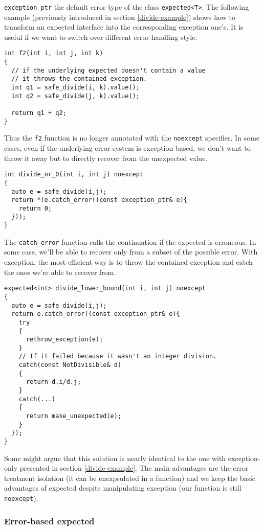 \documentclass[a4paper,10pt]{article}
\newcommand{\cpp}[1]{\lstinline{#1}}
\begin{document}
\cpp{exception_ptr} the default error type of the class \cpp{expected<T>}. The following example (previously introduced in section \ref{divide-example}) shows how to transform an expected interface into the corresponding exception one's. It is useful if we want to switch over different error-handling style.

\begin{lstlisting}
int f2(int i, int j, int k)
{
  // if the underlying expected doesn't contain a value
  // it throws the contained exception.
  int q1 = safe_divide(i, k).value();
  int q2 = safe_divide(j, k).value();

  return q1 + q2;
}
\end{lstlisting}

Thus the \cpp{f2} function is no longer annotated with the \cpp{noexcept} specifier. In some cases, even if the underlying error system is exception-based, we don't want to throw it away but to directly recover from the unexpected value. 

\begin{lstlisting}
int divide_or_0(int i, int j) noexcept
{
  auto e = safe_divide(i,j);
  return *(e.catch_error((const exception_ptr& e){
    return 0;
  }));
}
\end{lstlisting}

The \cpp{catch_error} function calls the continuation if the expected is erroneous. In some case, we'll be able to recover only from a subset of the possible error. With exception, the most efficient way is to throw the contained exception and catch the ones we're able to recover from.

\begin{lstlisting}
expected<int> divide_lower_bound(int i, int j) noexcept
{
  auto e = safe_divide(i,j);
  return e.catch_error((const exception_ptr& e){
    try
    {
      rethrow_exception(e);
    }
    // If it failed because it wasn't an integer division.
    catch(const NotDivisible& d)
    {
      return d.i/d.j;
    }
    catch(...)
    {
      return make_unexpected(e);
    }
  });
}
\end{lstlisting}

Some might argue that this solution is nearly identical to the one with exception-only presented in section \ref{divide-example}. The main advantages are the error treatment isolation (it can be encapsulated in a function) and we keep the basic advantages of expected despite manipulating exception (our function is still \cpp{noexcept}).

\subsubsection{Error-based expected}
\end{document}
